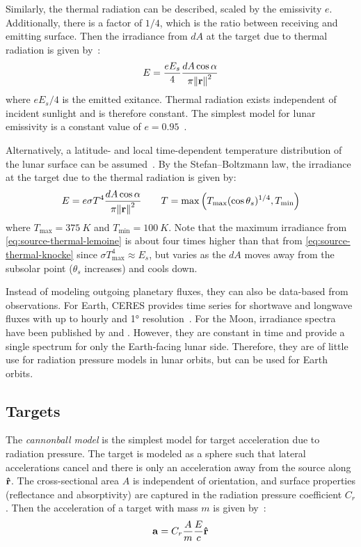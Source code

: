 \documentclass[parskip=full,DIV=15]{scrartcl}
\begin{document}
Similarly, the thermal radiation can be described, scaled by the emissivity $e$. Additionally, there is a factor of $1/4$, which is the ratio between receiving and emitting surface. Then the irradiance from $dA$ at the target due to thermal radiation is given by~\cite{Knocke1988}:
\begin{align}\label{eq:source-thermal-knocke}
   E = \frac{e E_s}{4} \frac{dA\cos\alpha}{\pi \norm{\vb r}^2}
\end{align}
where $e E_s/4$ is the emitted exitance. Thermal radiation exists independent of incident sunlight and is therefore constant. The simplest model for lunar emissivity is a constant value of $e=0.95$~\cite{Mueller2021}.

Alternatively, a latitude- and local time-dependent temperature distribution of the lunar surface can be assumed~\cite{Lemoine2013}. By the Stefan--Boltzmann law, the irradiance at the target due to the thermal radiation is given by:
\begin{align}\label{eq:source-thermal-lemoine}
   E = e\sigma T^4 \frac{dA\cos\alpha}{\pi \norm{\vb r}^2}
   \qquad
   T = \max\left(T_\text{max}(\cos\theta_s)^{1/4}, T_\text{min}\right)
\end{align}
where $T_\text{max}=\SI{375}{K}$ and $T_\text{min}=\SI{100}{K}$. Note that the maximum irradiance from \cref{eq:source-thermal-lemoine} is about four times higher than that from \cref{eq:source-thermal-knocke} since $\sigma T_\text{max}^4 \approx E_s$, but varies as the $dA$ moves away from the subsolar point ($\theta_s$ increases) and cools down.

Instead of modeling outgoing planetary fluxes, they can also be data-based from observations. For Earth, CERES provides time series for shortwave and longwave fluxes with up to hourly and \ang{1} resolution~\cite[]{Doelling2016}. For the Moon, irradiance spectra have been published by \textcite{Kieffer2005} and \textcite{Sun2021}. However, they are constant in time and provide a single spectrum for only the Earth-facing lunar side. Therefore, they are of little use for radiation pressure models in lunar orbits, but can be used for Earth orbits.



\subsection{Targets}
The \emph{cannonball model} is the simplest model for target acceleration due to radiation pressure. The target is modeled as a sphere such that lateral accelerations cancel and there is only an acceleration away from the source along $\vu r$. The cross-sectional area $A$ is independent of orientation, and surface properties (reflectance and absorptivity) are captured in the radiation pressure coefficient $C_r$. Then the acceleration of a target with mass $m$ is given by~\cite{Knocke1988}:
\begin{align}
   \vb a = C_r \frac{A}{m} \frac{E}{c} \vu r
\end{align}
\end{document}
